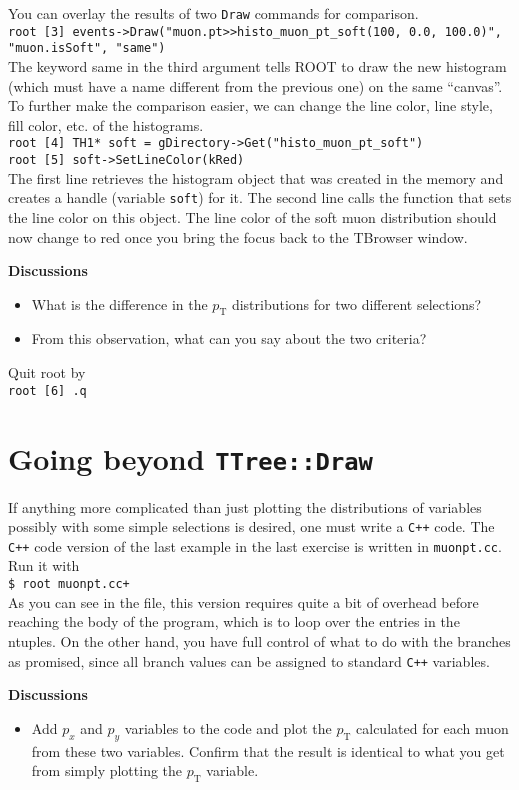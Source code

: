 \documentclass[12pt]{article}
\newcommand{\cpp}{\texttt{C++}\xspace}
\newcommand{\terminal}[1]{\vspace{3pt}\texttt{\$ #1} \\}
\newcommand{\rterminal}[2]{\vspace{3pt}\texttt{root [#1] #2} \\}
\newcommand{\pt}{\ensuremath{p_{\mathrm{T}}}\xspace}
\newenvironment{discussions}{%
\vspace{0.2in}%
\textbf{Discussions}%
\begin{itemize}%
}{%
\end{itemize}%
}
\begin{document}
You can overlay the results of two \texttt{Draw} commands for comparison. \\
\rterminal{3}{events->Draw("muon.pt>>histo\_muon\_pt\_soft(100, 0.0, 100.0)", "muon.isSoft", "same")}
The keyword same in the third argument tells ROOT to draw the new histogram (which must have a name different from the previous one) on the same ``canvas''. To further make the comparison easier, we can change the line color, line style, fill color, etc. of the histograms. \\
\rterminal{4}{TH1* soft = gDirectory->Get("histo\_muon\_pt\_soft")}
\rterminal{5}{soft->SetLineColor(kRed)}
The first line retrieves the histogram object that was created in the memory and creates a handle (variable \texttt{soft}) for it. The second line calls the function that sets the line color on this object. The line color of the soft muon distribution should now change to red once you bring the focus back to the TBrowser window.

\begin{discussions}
\item What is the difference in the \pt distributions for two different selections?
\item From this observation, what can you say about the two criteria?
\end{discussions}

Quit root by \\
\rterminal{6}{.q}

\section{Going beyond \texttt{TTree::Draw}}
If anything more complicated than just plotting the distributions of variables possibly with some simple selections is desired, one must write a \cpp code. The \cpp code version of the last example in the last exercise is written in \texttt{muonpt.cc}. Run it with \\
\terminal{root muonpt.cc+}

As you can see in the file, this version requires quite a bit of overhead before reaching the body of the program, which is to loop over the entries in the ntuples. On the other hand, you have full control of what to do with the branches as promised, since all branch values can be assigned to standard \cpp variables.

\begin{discussions}
\item Add $p_{x}$ and $p_{y}$ variables to the code and plot the \pt calculated for each muon from these two variables. Confirm that the result is identical to what you get from simply plotting the \pt variable.
\end{discussions}
\end{document}

